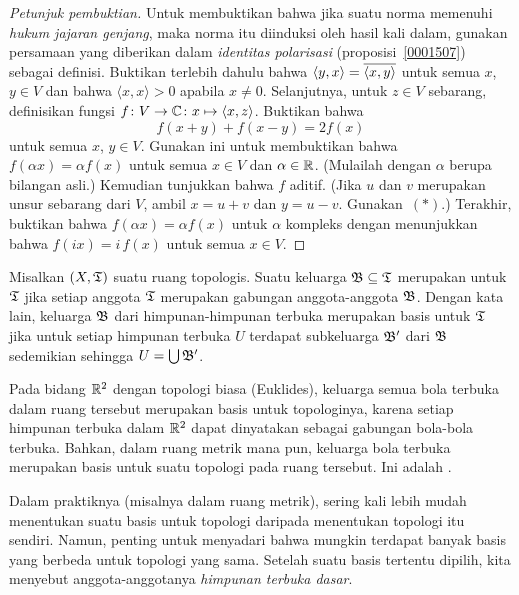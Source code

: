 \begin{proof}[\emph{Petunjuk pembuktian}] Untuk membuktikan bahwa jika suatu norma memenuhi
\emph{hukum jajaran genjang}, maka norma itu diinduksi oleh hasil kali dalam, gunakan
persamaan yang diberikan dalam \emph{identitas polarisasi}
(proposisi~\ref{0001507}) sebagai definisi. Buktikan terlebih dahulu bahwa
$\langle y,x \rangle = \overline{\langle x,y \rangle}$ untuk semua $x$, $y\in V$ dan bahwa
$\langle x,x \rangle > 0$ apabila $x \ne 0$. Selanjutnya, untuk $z \in V$ sebarang,
definisikan fungsi $f\colon V \rightarrow \mathbb{C}\colon x \mapsto \langle x,z \rangle$. Buktikan bahwa
   \[ f(x + y) + f(x - y) = 2f(x) \tag{$\ast$} \]
untuk semua $x$, $y \in V$. Gunakan ini untuk membuktikan bahwa
$f(\alpha x) = \alpha f(x)$ untuk semua $x \in V$ dan $\alpha \in \mathbb{R}$.
(Mulailah dengan $\alpha$ berupa bilangan asli.) Kemudian tunjukkan bahwa $f$ aditif. (Jika
$u$ dan $v$ merupakan unsur sebarang dari $V$, ambil $x = u + v$ dan $y = u - v$.
Gunakan~$(\ast)$.) Terakhir, buktikan bahwa $f(\alpha x) = \alpha f(x)$ untuk $\alpha$
kompleks dengan menunjukkan bahwa $f(ix) = i\,f(x)$ untuk semua $x \in V$. \ns
\end{proof}

\begin{defn} Misalkan $(X,\mathfrak{T})$ suatu ruang topologis. Suatu keluarga
$\mathfrak{B} \subseteq \mathfrak{T}$ merupakan
 untuk $\mathfrak{T}$ jika setiap anggota $\mathfrak{T}$ merupakan gabungan anggota-anggota
$\mathfrak{B}$. Dengan kata lain, keluarga $\mathfrak{B}$ dari himpunan-himpunan terbuka merupakan
basis untuk $\mathfrak{T}$ jika untuk setiap himpunan terbuka $U$ terdapat subkeluarga
$\mathfrak{B}'$ dari $\mathfrak{B}$ sedemikian sehingga $U = \bigcup \mathfrak{B}'$.
\end{defn}

\begin{exam}\label{xmpl_top_metric} Pada bidang $\mathbb{R}^2$ dengan topologi biasa
(Euklides), keluarga semua bola terbuka dalam ruang tersebut merupakan basis untuk
topologinya, karena setiap himpunan terbuka dalam $\mathbb{R}^2$ dapat dinyatakan sebagai gabungan
bola-bola terbuka. Bahkan, dalam ruang metrik mana pun, keluarga bola terbuka merupakan
basis untuk suatu topologi pada ruang tersebut. Ini adalah
.
\end{exam}

Dalam praktiknya (misalnya dalam ruang metrik), sering kali lebih mudah menentukan suatu
basis untuk topologi daripada menentukan topologi itu sendiri. Namun, penting untuk
menyadari bahwa mungkin terdapat banyak basis yang berbeda untuk topologi yang sama.
Setelah suatu basis tertentu dipilih, kita menyebut anggota-anggotanya
\emph{himpunan terbuka dasar}.

